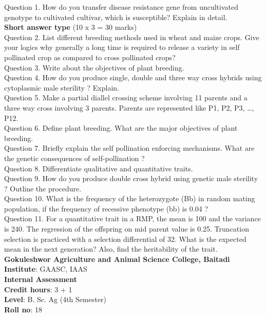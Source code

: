 \documentclass[12pt]{article}\usepackage[]{graphicx}\usepackage[]{color}
\begin{document}
Question 1. How do you transfer disease resistance gene from uncultivated genotype to cultivated cultivar, which is susceptible? Explain in detail.\\
\textbf{Short answer type} (10 x 3 = 30 marks) \\
Question 2. List different breeding methods used in wheat and maize crops. Give your logics why generally a long time is required to release a variety in self pollinated crop as compared to cross pollinated crops?\\
Question 3. Write about the objectives of plant breeding.\\
Question 4. How do you produce single, double and three way cross hybrids using cytoplasmic male sterility ? Explain.\\
Question 5. Make a partial diallel crossing scheme involving 11 parents and a three way cross involving 3 parents. Parents are represented like P1, P2, P3, …, P12.\\
Question 6. Define plant breeding. What are the major objectives of plant breeding.\\
Question 7. Briefly explain the self pollination enforcing mechanisms. What are the genetic consequences of self-pollination ?\\
Question 8. Differentiate qualitative and quantitative traits.\\
Question 9. How do you produce double cross hybrid using genetic male sterility ? Outline the procedure.\\
Question 10. What is the frequency of the heterozygote (Bb) in random mating population, if the frequency of recessive phenotype (bb) is 0.04 ?\\
Question 11. For a quantitative trait in a RMP, the mean is 100 and the variance is 240. The regression of the offspring on mid parent value is 0.25. Truncation selection is practiced with a selection differential of 32. What is the expected mean in the next generation? Also, find the heritability of the trait.\\
\clearpage 
{\centering \Large{\textbf{Gokuleshwor Agriculture and Animal Science College, Baitadi}} \\[0.25cm]
            \textbf{Institute}: GAASC, IAAS \\[0.2cm]
            \textbf{Internal Assessment} \\[0.2cm]} 
\textbf{Credit hours}: 3 + 1 \\ 
\textbf{Level}: B. Sc. Ag (4th Semester) \\
\textbf{Roll no}: 18 \\[0.5cm] 
\end{document}
